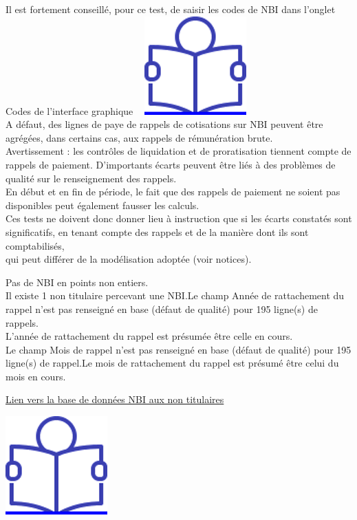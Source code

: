 Il est fortement conseillé, pour ce test, de saisir les codes de NBI
dans l'onglet Codes de l'interface graphique ~
\href{../Docs/Notices/fiche_onglet_codes.odt}{\includegraphics{icones/Notice.png}}\\
A défaut, des lignes de paye de rappels de cotisations sur NBI peuvent
être agrégées, dans certains cas, aux rappels de rémunération brute.\\
Avertissement : les contrôles de liquidation et de proratisation
tiennent compte de rappels de paiement. D'importants écarts peuvent être
liés à des problèmes de qualité sur le renseignement des rappels.\\
En début et en fin de période, le fait que des rappels de paiement ne
soient pas disponibles peut également fausser les calculs.\\
Ces tests ne doivent donc donner lieu à instruction que si les écarts
constatés sont significatifs, en tenant compte des rappels et de la
manière dont ils sont comptabilisés,\\
qui peut différer de la modélisation adoptée (voir notices).

Pas de NBI en points non entiers.\\
Il existe 1 non titulaire percevant une NBI.Le champ Année de
rattachement du rappel n'est pas renseigné en base (défaut de qualité)
pour 195 ligne(s) de rappels.\\
L'année de rattachement du rappel est présumée être celle en cours.\\
Le champ Mois de rappel n'est pas renseigné en base (défaut de qualité)
pour 195 ligne(s) de rappel.Le mois de rattachement du rappel est
présumé être celui du mois en cours.

\href{../Bases/Reglementation/NBI.aux.non.titulaires.csv}{Lien vers la base
de données NBI aux non titulaires}

\href{../Docs/Notices/fiche_NBI_nt.odt}{\includegraphics{icones/Notice.png}}

